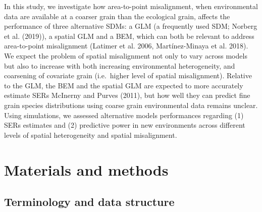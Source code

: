 \documentclass[
  12pt,
  a4paper]{article}
\begin{document}
In this study, we investigate how area-to-point misalignment, when environmental data are available at a coarser grain than the ecological grain, affects the performance of three alternative SDMs: a GLM (a frequently used SDM; Norberg et al. (2019)), a spatial GLM and a BEM, which can both be relevant to address area-to-point misalignment (Latimer et al. 2006, Martínez-Minaya et al. 2018). We expect the problem of spatial misalignment not only to vary across models but also to increase with both increasing environmental heterogeneity, and coarsening of covariate grain (i.e.~higher level of spatial misalignment). Relative to the GLM, the BEM and the spatial GLM are expected to more accurately estimate SERs McInerny and Purves (2011), but how well they can predict fine grain species distributions using coarse grain environmental data remains unclear. Using simulations, we assessed alternative models performances regarding (1) SERs estimates and (2) predictive power in new environments across different levels of spatial heterogeneity and spatial misalignment.

\hypertarget{materials-and-methods}{%
\section{Materials and methods}\label{materials-and-methods}}

\hypertarget{terminology-and-data-structure}{%
\subsection{Terminology and data structure}\label{terminology-and-data-structure}}
\end{document}

